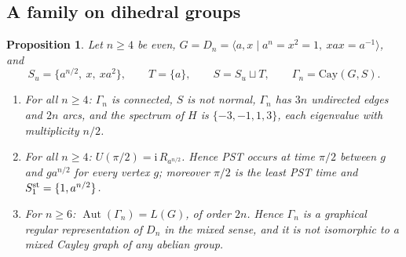 \documentclass[preprint,11pt]{elsarticle}
\newtheorem{proposition}[theorem]{Proposition}
\theoremstyle{definition}
\theoremstyle{remark}
\DeclareMathOperator{\Aut}{Aut}
\newcommand{\ii}{\mathrm i}
\begin{document}
\subsection{A family on dihedral groups}

\begin{proposition}\label{prop:Dn}
Let $n\ge4$ be even, $G=D_n=\langle a,x\mid a^n=x^2=1,\ xax=a^{-1}\rangle$, and
\[
S_u=\{a^{n/2},\ x,\ xa^2\},\qquad T=\{a\},\qquad S=S_u\sqcup T,\qquad\Gamma_n=\mathrm{Cay}(G,S).
\]
\begin{enumerate}
\item[(i)] For all $n\ge4$: $\Gamma_n$ is connected, $S$ is not normal, $\Gamma_n$ has $3n$ undirected edges and $2n$ arcs, and the spectrum of $H$ is $\{-3,-1,1,3\}$, each eigenvalue with multiplicity $n/2$.
\item[(ii)] For all $n\ge4$: $U(\pi/2)=\ii\,R_{a^{n/2}}$. Hence PST occurs at time $\pi/2$ between $g$ and $ga^{n/2}$ for every vertex $g$; moreover $\pi/2$ is the least PST time and $S_1^{\rm st}=\{1,a^{n/2}\}$.
\item[(iii)] For $n\ge6$: $\Aut(\Gamma_n)=L(G)$, of order $2n$. Hence $\Gamma_n$ is a graphical regular representation of $D_n$ in the mixed sense, and it is not isomorphic to a mixed Cayley graph of any abelian group.
\end{enumerate}
\end{proposition}
\end{document}
